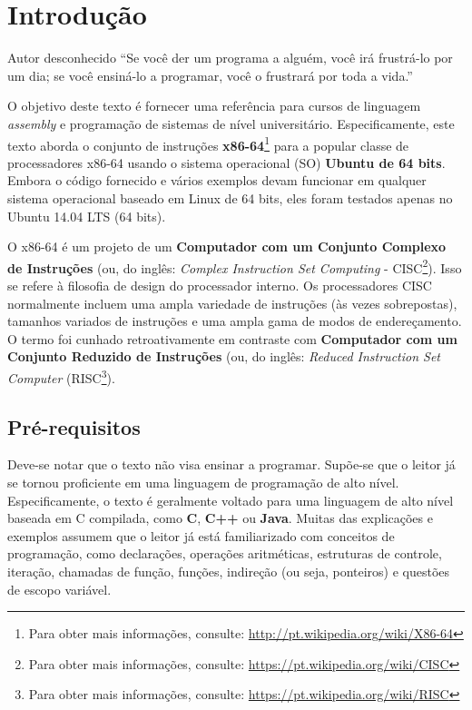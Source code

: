 \chapter{Introdução}

\begin{chapquote}{Autor desconhecido}
``Se você der um programa a alguém, você irá
frustrá-lo por um dia; se você ensiná-lo a
programar, você o frustrará por toda a vida.''

\end{chapquote}
\label{cap1}
O objetivo deste texto é fornecer uma referência para cursos de linguagem \textit{assembly} e programação de sistemas de nível universitário. Especificamente, este texto aborda o conjunto de instruções \textbf{x86-64}\footnote{Para obter mais informações, consulte: \url{http://pt.wikipedia.org/wiki/X86-64}} para a popular classe de processadores x86-64 usando o sistema operacional (SO) \textbf{Ubuntu de 64 bits}. Embora o código fornecido e vários exemplos devam funcionar em qualquer sistema operacional baseado em Linux de 64 bits, eles foram testados apenas no Ubuntu 14.04 LTS (64 bits).

O x86-64 é um projeto de um \textbf{Computador com um Conjunto Complexo de Instruções} (ou, do inglês: \textit{Complex Instruction Set Computing} - CISC\footnote{Para obter mais informações, consulte: \url{https://pt.wikipedia.org/wiki/CISC}}). Isso se refere à filosofia de design do processador interno. Os processadores CISC normalmente incluem uma ampla variedade de instruções (às vezes sobrepostas), tamanhos variados de instruções e uma ampla gama de modos de endereçamento. O termo foi cunhado retroativamente em contraste com \textbf{Computador com um Conjunto Reduzido de Instruções} (ou, do inglês: \textit{Reduced Instruction Set Computer} (RISC\footnote{Para obter mais informações, consulte: \url{https://pt.wikipedia.org/wiki/RISC}}).

\section{Pré-requisitos}
Deve-se notar que o texto não visa ensinar a programar. Supõe-se que o leitor já se tornou proficiente em uma linguagem de programação de alto nível. Especificamente, o texto é geralmente voltado para uma linguagem de alto nível baseada em C compilada, como \textbf{C}, \textbf{C++} ou \textbf{Java}. Muitas das explicações e exemplos assumem que o leitor já está familiarizado com conceitos de programação, como declarações, operações aritméticas, estruturas de controle, iteração, chamadas de função, funções, indireção (ou seja, ponteiros) e questões de escopo variável.

